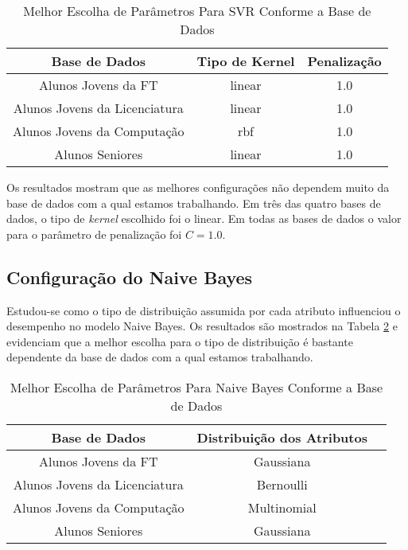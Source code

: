 \begin{table}
\begin{center}
\begin{tabular}[c]{| c | c | c |}
    \hline
    \textbf{Base de Dados} & \textbf{Tipo de Kernel} & \textbf{Penalização} \\
    \hline
    Alunos Jovens da FT & linear & 1.0 \\
    \hline
    Alunos Jovens da Licenciatura & linear & 1.0 \\
    \hline
    Alunos Jovens da Computação & rbf & 1.0 \\
    \hline
    Alunos Seniores & linear & 1.0 \\
    \hline
\end{tabular}
\end{center}
\caption{Melhor Escolha de Parâmetros Para SVR Conforme a Base de Dados}
\label{svr_conf}
\end{table}

Os resultados mostram que as melhores configurações não dependem muito da base de
dados com a qual estamos trabalhando. Em três das quatro bases de dados, o tipo de
\textit{kernel} escolhido foi o linear. Em todas as bases de dados o valor para o
parâmetro de penalização foi $C = 1.0$.   

\subsection{Configuração do Naive Bayes}
Estudou-se como o tipo de distribuição assumida por cada atributo influenciou o
desempenho no modelo Naive Bayes. Os resultados são mostrados na Tabela \ref{conf_nb} e
evidenciam que a melhor escolha para o tipo de distribuição é bastante dependente da
base de dados com a qual estamos trabalhando. 

\begin{table}
\begin{center}
\begin{tabular}[c]{| c | c | c |}
    \hline
    \textbf{Base de Dados} & \textbf{Distribuição dos Atributos} \\
    \hline
    Alunos Jovens da FT & Gaussiana \\
    \hline
    Alunos Jovens da Licenciatura & Bernoulli \\
    \hline
    Alunos Jovens da Computação & Multinomial \\
    \hline
    Alunos Seniores & Gaussiana \\
    \hline
\end{tabular}
\end{center}
\caption{Melhor Escolha de Parâmetros Para Naive Bayes Conforme a Base de Dados}
\label{conf_nb}
\end{table}

